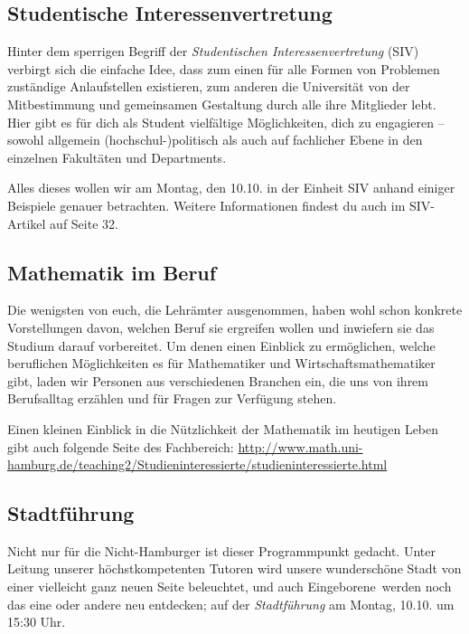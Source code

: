 \subsection*{Studentische Interessenvertretung}

Hinter dem sperrigen Begriff der \emph{Studentischen Interessenvertretung}
(SIV) verbirgt sich die einfache Idee, dass zum einen für alle Formen von
Problemen zuständige Anlaufstellen existieren, zum anderen die Universität von
der Mitbestimmung und gemeinsamen Gestaltung durch alle ihre Mitglieder lebt.
Hier gibt es für dich als Student vielfältige Möglichkeiten, dich zu engagieren
-- sowohl allgemein (hochschul-)politisch als auch auf fachlicher Ebene in den
einzelnen Fakultäten und Departments.



Alles dieses wollen wir am Montag, den 10.10. in der Einheit SIV anhand einiger
Beispiele genauer betrachten. Weitere Informationen findest du auch im
SIV-Artikel auf Seite 32.

\subsection*{Mathematik im Beruf}

Die wenigsten von euch, die Lehrämter ausgenommen, haben wohl schon konkrete
Vorstellungen davon, welchen Beruf sie ergreifen wollen und inwiefern sie das
Studium darauf vorbereitet. Um denen einen Einblick zu ermöglichen, welche
beruflichen Möglichkeiten es für Mathematiker und Wirtschaftsmathematiker gibt,
laden wir Personen aus verschiedenen Branchen ein, die uns von ihrem
Berufsalltag erzählen und für Fragen zur Verfügung stehen.

Einen kleinen Einblick in die Nützlichkeit der Mathematik im heutigen Leben
gibt auch folgende Seite des Fachbereich:
\url{http://www.math.uni-hamburg.de/teaching2/Studieninteressierte/studieninteressierte.html}

\subsection*{Stadtführung}


Nicht nur für die Nicht-Hamburger ist dieser Programmpunkt gedacht.  Unter
Leitung unserer höchstkompetenten Tutoren wird unsere wunderschöne Stadt von
einer vielleicht ganz neuen Seite beleuchtet, und auch \glqq Eingeborene\grqq\
werden noch das eine oder andere neu entdecken; auf der \emph{Stadtführung} am
Montag, 10.10. um 15:30 Uhr.

